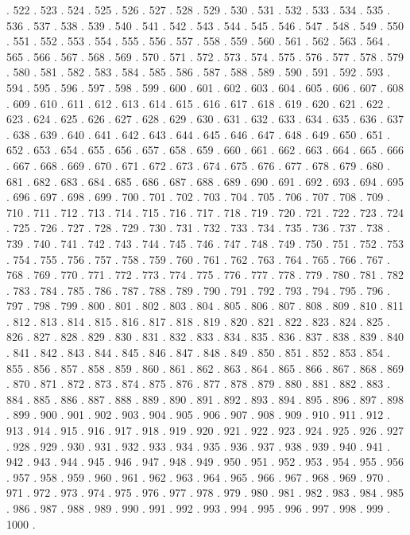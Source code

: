 \documentclass[10pt]{mybook4}
\begin{document}
\begin{Schunk}
\begin{Soutput}
. 522 . 523 . 524 . 525 . 526 . 527 . 528 . 529 . 530 . 531 . 532 . 533 . 534 . 535 . 536 . 537 . 538 . 539 . 540 . 541 . 542 . 543 . 544 . 545 . 546 . 547 . 548 . 549 . 550 . 551 . 552 . 553 . 554 . 555 . 556 . 557 . 558 . 559 . 560 . 561 . 562 . 563 . 564 . 565 . 566 . 567 . 568 . 569 . 570 . 571 . 572 . 573 . 574 . 575 . 576 . 577 . 578 . 579 . 580 . 581 . 582 . 583 . 584 . 585 . 586 . 587 . 588 . 589 . 590 . 591 . 592 . 593 . 594 . 595 . 596 . 597 . 598 . 599 . 600 . 601 . 602 . 603 . 604 . 605 . 606 . 607 . 608 . 609 . 610 . 611 . 612 . 613 . 614 . 615 . 616 . 617 . 618 . 619 . 620 . 621 . 622 . 623 . 624 . 625 . 626 . 627 . 628 . 629 . 630 . 631 . 632 . 633 . 634 . 635 . 636 . 637 . 638 . 639 . 640 . 641 . 642 . 643 . 644 . 645 . 646 . 647 . 648 . 649 . 650 . 651 . 652 . 653 . 654 . 655 . 656 . 657 . 658 . 659 . 660 . 661 . 662 . 663 . 664 . 665 . 666 . 667 . 668 . 669 . 670 . 671 . 672 . 673 . 674 . 675 . 676 . 677 . 678 . 679 . 680 . 681 . 682 . 683 . 684 . 685 . 686 . 687 . 688 . 689 . 690 . 691 . 692 . 693 . 694 . 695 . 696 . 697 . 698 . 699 . 700 . 701 . 702 . 703 . 704 . 705 . 706 . 707 . 708 . 709 . 710 . 711 . 712 . 713 . 714 . 715 . 716 . 717 . 718 . 719 . 720 . 721 . 722 . 723 . 724 . 725 . 726 . 727 . 728 . 729 . 730 . 731 . 732 . 733 . 734 . 735 . 736 . 737 . 738 . 739 . 740 . 741 . 742 . 743 . 744 . 745 . 746 . 747 . 748 . 749 . 750 . 751 . 752 . 753 . 754 . 755 . 756 . 757 . 758 . 759 . 760 . 761 . 762 . 763 . 764 . 765 . 766 . 767 . 768 . 769 . 770 . 771 . 772 . 773 . 774 . 775 . 776 . 777 . 778 . 779 . 780 . 781 . 782 . 783 . 784 . 785 . 786 . 787 . 788 . 789 . 790 . 791 . 792 . 793 . 794 . 795 . 796 . 797 . 798 . 799 . 800 . 801 . 802 . 803 . 804 . 805 . 806 . 807 . 808 . 809 . 810 . 811 . 812 . 813 . 814 . 815 . 816 . 817 . 818 . 819 . 820 . 821 . 822 . 823 . 824 . 825 . 826 . 827 . 828 . 829 . 830 . 831 . 832 . 833 . 834 . 835 . 836 . 837 . 838 . 839 . 840 . 841 . 842 . 843 . 844 . 845 . 846 . 847 . 848 . 849 . 850 . 851 . 852 . 853 . 854 . 855 . 856 . 857 . 858 . 859 . 860 . 861 . 862 . 863 . 864 . 865 . 866 . 867 . 868 . 869 . 870 . 871 . 872 . 873 . 874 . 875 . 876 . 877 . 878 . 879 . 880 . 881 . 882 . 883 . 884 . 885 . 886 . 887 . 888 . 889 . 890 . 891 . 892 . 893 . 894 . 895 . 896 . 897 . 898 . 899 . 900 . 901 . 902 . 903 . 904 . 905 . 906 . 907 . 908 . 909 . 910 . 911 . 912 . 913 . 914 . 915 . 916 . 917 . 918 . 919 . 920 . 921 . 922 . 923 . 924 . 925 . 926 . 927 . 928 . 929 . 930 . 931 . 932 . 933 . 934 . 935 . 936 . 937 . 938 . 939 . 940 . 941 . 942 . 943 . 944 . 945 . 946 . 947 . 948 . 949 . 950 . 951 . 952 . 953 . 954 . 955 . 956 . 957 . 958 . 959 . 960 . 961 . 962 . 963 . 964 . 965 . 966 . 967 . 968 . 969 . 970 . 971 . 972 . 973 . 974 . 975 . 976 . 977 . 978 . 979 . 980 . 981 . 982 . 983 . 984 . 985 . 986 . 987 . 988 . 989 . 990 . 991 . 992 . 993 . 994 . 995 . 996 . 997 . 998 . 999 . 1000 . 
\end{Soutput}
\end{Schunk}
\end{document}
